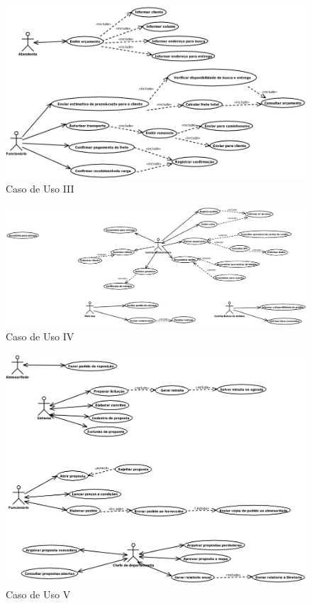 \documentclass[a4paper,26pt]{article}
\begin{document}
\begin{figure}[ht]
  \centering
  \includegraphics[width=14.5cm]{./CasoDeUso3.png}
  \caption{Caso de Uso III}
  \label{fig:quadcorephota}
\end{figure}

\begin{figure}[ht]
  \centering
  \includegraphics[width=14.5cm]{./CasoDeUso4.png}
  \caption{Caso de Uso IV}
  \label{fig:quadcorephota}
\end{figure}

\begin{figure}[ht]
  \centering
  \includegraphics[width=14.5cm]{./CasoDeUso5.png}
  \caption{Caso de Uso V}
  \label{fig:quadcorephota}
\end{figure}
\end{document}
